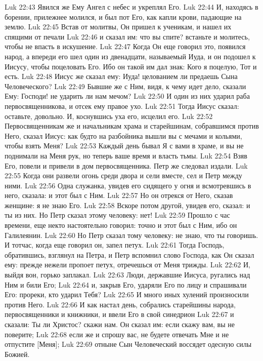 Luk 22:43  Явился же Ему Ангел с небес и укреплял Его.
Luk 22:44  И, находясь в борении, прилежнее молился, и был пот Его, как капли крови, падающие на землю.
Luk 22:45  Встав от молитвы, Он пришел к ученикам, и нашел их спящими от печали
Luk 22:46  и сказал им: что вы спите? встаньте и молитесь, чтобы не впасть в искушение.
Luk 22:47  Когда Он еще говорил это, появился народ, а впереди его шел один из двенадцати, называемый Иуда, и он подошел к Иисусу, чтобы поцеловать Его. Ибо он такой им дал знак: Кого я поцелую, Тот и есть.
Luk 22:48  Иисус же сказал ему: Иуда! целованием ли предаешь Сына Человеческого?
Luk 22:49  Бывшие же с Ним, видя, к чему идет дело, сказали Ему: Господи! не ударить ли нам мечом?
Luk 22:50  И один из них ударил раба первосвященникова, и отсек ему правое ухо.
Luk 22:51  Тогда Иисус сказал: оставьте, довольно. И, коснувшись уха его, исцелил его.
Luk 22:52  Первосвященникам же и начальникам храма и старейшинам, собравшимся против Него, сказал Иисус: как будто на разбойника вышли вы с мечами и кольями, чтобы взять Меня?
Luk 22:53  Каждый день бывал Я с вами в храме, и вы не поднимали на Меня рук, но теперь ваше время и власть тьмы.
Luk 22:54  Взяв Его, повели и привели в дом первосвященника. Петр же следовал издали.
Luk 22:55  Когда они развели огонь среди двора и сели вместе, сел и Петр между ними.
Luk 22:56  Одна служанка, увидев его сидящего у огня и всмотревшись в него, сказала: и этот был с Ним.
Luk 22:57  Но он отрекся от Него, сказав женщине: я не знаю Его.
Luk 22:58  Вскоре потом другой, увидев его, сказал: и ты из них. Но Петр сказал этому человеку: нет!
Luk 22:59  Прошло с час времени, еще некто настоятельно говорил: точно и этот был с Ним, ибо он Галилеянин.
Luk 22:60  Но Петр сказал тому человеку: не знаю, что ты говоришь. И тотчас, когда еще говорил он, запел петух.
Luk 22:61  Тогда Господь, обратившись, взглянул на Петра, и Петр вспомнил слово Господа, как Он сказал ему: прежде нежели пропоет петух, отречешься от Меня трижды.
Luk 22:62  И, выйдя вон, горько заплакал.
Luk 22:63  Люди, державшие Иисуса, ругались над Ним и били Его;
Luk 22:64  и, закрыв Его, ударяли Его по лицу и спрашивали Его: прореки, кто ударил Тебя?
Luk 22:65  И много иных хулений произносили против Него.
Luk 22:66  И как настал день, собрались старейшины народа, первосвященники и книжники, и ввели Его в свой синедрион
Luk 22:67  и сказали: Ты ли Христос? скажи нам. Он сказал им: если скажу вам, вы не поверите;
Luk 22:68  если же и спрошу вас, не будете отвечать Мне и не отпустите [Меня];
Luk 22:69  отныне Сын Человеческий воссядет одесную силы Божией.
